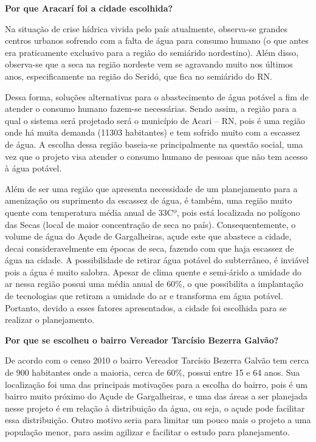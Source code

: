 \textbf{Por que  Aracarí foi a cidade escolhida?}

Na situação de crise hídrica vivida pelo país atualmente, observa-se grandes centros urbanos sofrendo com a falta de água
para consumo humano (o que antes era praticamente exclusivo para a região do semiárido nordestino). Além disso, observa-se que
a seca na região nordeste vem se agravando muito nos últimos anos, especificamente na região do Seridó, que fica no semiárido do RN.

Dessa forma, soluções alternativas para o abastecimento de água potável a fim de atender o consumo humano fazem-se necessárias. 
Sendo assim, a região para a qual o sistema será projetado será o município de Acari – RN, pois é uma região onde há muita
demanda (11303 habitantes) e tem sofrido muito com a escassez de água. A escolha dessa região baseia-se principalmente na 
questão social, uma vez que o projeto visa atender o consumo humano de pessoas que não tem acesso à água potável.

Além de ser uma região que apresenta necessidade de um planejamento para a amenização ou suprimento da escassez de água, é 
também, uma região muito quente com temperatura média anual de 33Cº, pois está localizada no polígono das Secas 
(local de maior concentração de seca no país). Consequentemente, o volume de água do Açude de Gargalheiras, açude este que
abastece a cidade, decai consideravelmente em épocas de seca, fazendo com que haja escassez de água na cidade. A possibilidade
de retirar água potável do subterrâneo, é inviável pois a água é muito salobra. Apesar de clima quente e semi-árido a umidade
do ar nessa região  possui uma média anual de 60\%, o que possibilita a implantação de tecnologias que retiram a umidade do ar
e transforma em água potável. Portanto, devido a esses fatores apresentados, a cidade foi escolhida para se realizar o
planejamento.

\textbf{Por que se escolheu o bairro Vereador Tarcísio Bezerra Galvão?}

De acordo com o censo 2010 o bairro Vereador Tarcísio Bezerra Galvão tem cerca de 900 habitantes onde a maioria, cerca de 60\%,
possui entre 15 e 64 anos. Sua localização foi uma das principais motivações para a escolha do bairro, pois é um bairro muito
próximo do Açude de Gargalheiras, e uma das áreas a ser planejada nesse projeto é em relação à distribuição da água, ou seja,
o açude pode facilitar essa distribuição. Outro motivo seria para limitar um pouco mais o projeto a uma população menor, para
assim agilizar e facilitar o estudo para planejamento.


